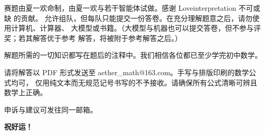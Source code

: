 \documentclass[UTF8]{ctexart}
\begin{document}
赛题由夏一欢命制，由夏一欢与若干智能体试做。感谢 Loveinterpretation 不可或缺
的贡献。
允许组队，但每队只能提交一份答卷。在充分理解题意之后，请勿使用计算机、计算器、
大模型或书籍。（大模型与机器也可以提交答卷，但不参与评奖；若其解答优于参考
解答，将被附于参考解答之后。）

解题所需的一切知识都写在题后的注释中。我们相信各位都已至少学完初中数学。

请将解答以 PDF 形式发送至 aether\_math@163.com。手写与排版印刷的数学公式均可，
仅用纯文本而无规范记号书写的不予接收。请确保所有公式清晰可辨且数学上正确。

申诉与建议可发往同一邮箱。

\vspace{1em}
\noindent \textbf{祝好运！}
\end{document}
